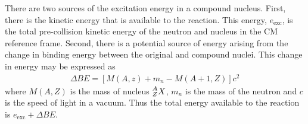 \documentclass[11pt]{article}
\newcommand\leftidx[3]{{\vphantom{#2}}#1#2#3}
\begin{document}
There are two sources of the excitation energy in a compound nucleus.  First, there is the kinetic energy that is available to the reaction.  This energy, \(e_{\text{exc}}\), is the total pre-collision kinetic energy of the neutron and nucleus in the CM reference frame.  Second, there is a potential source of energy arising from the change in binding energy between the original and compound nuclei.  This change in energy may be expressed as
\begin{align}
  \Delta BE = \left[ M(A,z) + m_n - M(A+1,Z) \right] c^2
\end{align}
where \(M(A,Z)\) is the mass of nucleus \(\leftidx{^A_Z}{X}{}\), \(m_n\) is the mass of the neutron and \(c\) is the speed of light in a vacuum.  Thus the total energy available to the reaction is \(e_{\text{exc}} + \Delta BE\).
\end{document}
